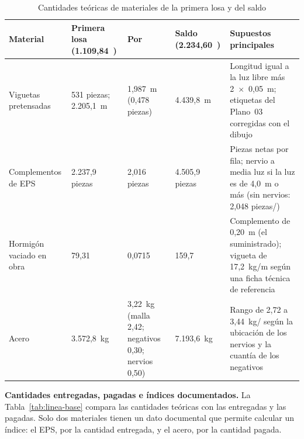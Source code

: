 \begin{table}[H]
\caption{Cantidades teóricas de materiales de la primera losa y del saldo}
\label{tab:cantidades-teoricas}
\setlength{\tabcolsep}{4pt}
\begin{tabularx}{\linewidth}{@{}P{2.75cm}P{2.6cm}P{2.45cm}P{2.55cm}L@{}}
\toprule
\textbf{Material} & \textbf{Primera losa (1.109,84~\mdos{})} & \textbf{Por \mdos{}} & \textbf{Saldo (2.234,60~\mdos{})} & \textbf{Supuestos principales} \\
\midrule
Viguetas pretensadas & 531 piezas; 2.205,1~m & 1,987~m (0,478 piezas) & 4.439,8~m & Longitud igual a la luz libre más 2~$\times$~0,05~m; etiquetas del Plano~03 corregidas con el dibujo \\
Complementos de EPS & 2.237,9 piezas & 2,016 piezas & 4.505,9 piezas & Piezas netas por fila; nervio a media luz si la luz es de 4,0~m o más (sin nervios: 2,048 piezas/\mdos{}) \\
Hormigón vaciado en obra & 79,31~\mtres{} & 0,0715~\mtres{} & 159,7~\mtres{} & Complemento de 0,20~m (el suministrado); vigueta de 17,2~kg/m según una ficha técnica de referencia \\
Acero & 3.572,8~kg & 3,22~kg (malla 2,42; negativos 0,30; nervios 0,50) & 7.193,6~kg & Rango de 2,72 a 3,44~kg/\mdos{} según la ubicación de los nervios y la cuantía de los negativos \\
\bottomrule
\end{tabularx}
\end{table}

\textbf{Cantidades entregadas, pagadas e índices documentados.} La Tabla~\ref{tab:linea-base} compara las cantidades teóricas con las entregadas y las pagadas. Solo dos materiales tienen un dato documental que permite calcular un índice: el EPS, por la cantidad entregada, y el acero, por la cantidad pagada.

